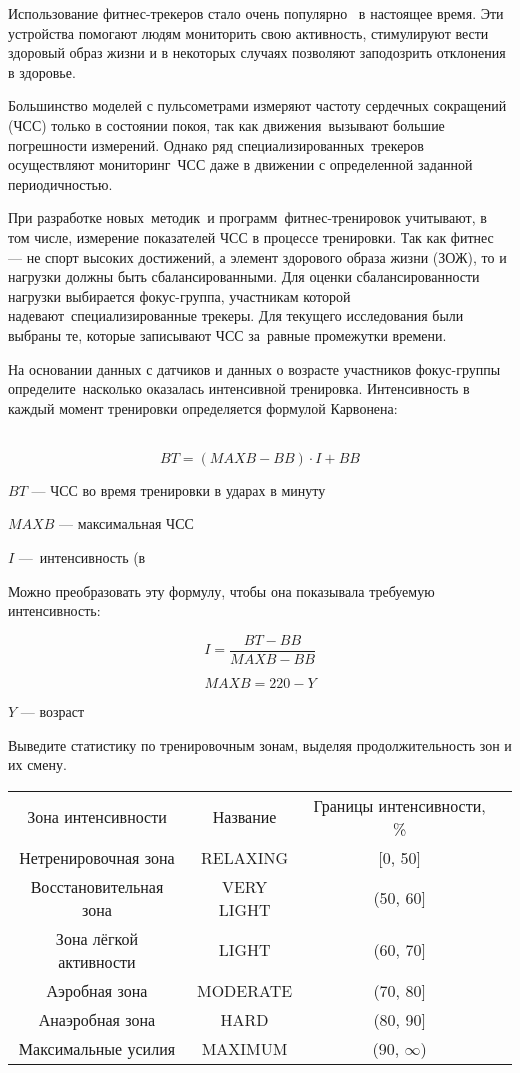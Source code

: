 
Использование фитнес-трекеров стало очень популярно  в настоящее время. Эти устройства помогают людям мониторить свою активность, стимулируют вести здоровый образ жизни и в некоторых случаях позволяют заподозрить отклонения в здоровье. 

Большинство моделей с пульсометрами измеряют частоту сердечных сокращений (ЧСС) только в состоянии покоя, так как движения вызывают большие погрешности измерений. Однако ряд специализированных трекеров осуществляют мониторинг ЧСС даже в движении с определенной заданной периодичностью.

При разработке новых методик и программ фитнес-тренировок учитывают, в том числе, измерение показателей ЧСС в процессе тренировки. Так как фитнес — не спорт высоких достижений, а элемент здорового образа жизни (ЗОЖ), то и нагрузки должны быть сбалансированными. Для оценки сбалансированности нагрузки выбирается фокус-группа, участникам которой надевают специализированные трекеры. Для текущего исследования были выбраны те, которые записывают ЧСС за равные промежутки времени.

На основании данных с датчиков и данных о возрасте участников фокус-группы определите насколько оказалась интенсивной тренировка. Интенсивность в каждый момент тренировки определяется формулой Карвонена:

 $$BT = (MAXB - BB) \cdot I + BB$$

$BT$ — ЧСС во время тренировки в ударах в минуту

$MAXB$ — максимальная ЧСС

$I$ — интенсивность (в %

Можно преобразовать эту формулу, чтобы она показывала требуемую интенсивность:

$$I = \dfrac{BT-BB}{MAXB-BB}$$

$$MAXB = 220 - Y$$

$Y$ — возраст

Выведите статистику по тренировочным зонам, выделяя продолжительность зон и их смену.


\begin{tabular}{|c|c|c|c|}
Зона интенсивности&Название&Границы интенсивности, \% \\
Нетренировочная зона&RELAXING&[0, 50]\\
Восстановительная зона&VERY LIGHT&(50, 60]\\
Зона лёгкой активности&LIGHT&(60, 70]\\
Аэробная зона&MODERATE&(70, 80]\\
Анаэробная зона&HARD&(80, 90]\\
Максимальные усилия&MAXIMUM&(90, $\infty$)\\
\end{tabular}


